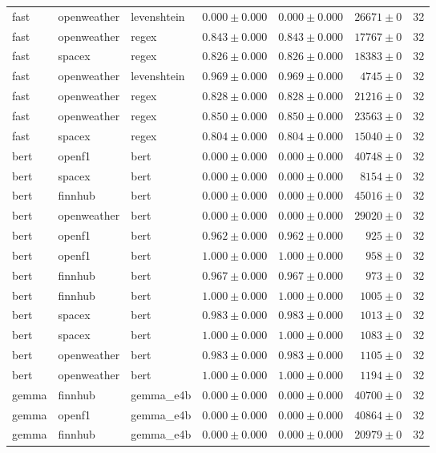 \begin{table}[htbp]
\begin{tabular}{l l l r r r r}
fast & openweather & levenshtein & $0.000\pm0.000$ & $0.000\pm0.000$ & $26671\pm0$ & 32 \\
fast & openweather & regex & $0.843\pm0.000$ & $0.843\pm0.000$ & $17767\pm0$ & 32 \\
fast & spacex & regex & $0.826\pm0.000$ & $0.826\pm0.000$ & $18383\pm0$ & 32 \\
fast & openweather & levenshtein & $0.969\pm0.000$ & $0.969\pm0.000$ & $4745\pm0$ & 32 \\
fast & openweather & regex & $0.828\pm0.000$ & $0.828\pm0.000$ & $21216\pm0$ & 32 \\
fast & openweather & regex & $0.850\pm0.000$ & $0.850\pm0.000$ & $23563\pm0$ & 32 \\
fast & spacex & regex & $0.804\pm0.000$ & $0.804\pm0.000$ & $15040\pm0$ & 32 \\
bert & openf1 & bert & $0.000\pm0.000$ & $0.000\pm0.000$ & $40748\pm0$ & 32 \\
bert & spacex & bert & $0.000\pm0.000$ & $0.000\pm0.000$ & $8154\pm0$ & 32 \\
bert & finnhub & bert & $0.000\pm0.000$ & $0.000\pm0.000$ & $45016\pm0$ & 32 \\
bert & openweather & bert & $0.000\pm0.000$ & $0.000\pm0.000$ & $29020\pm0$ & 32 \\
bert & openf1 & bert & $0.962\pm0.000$ & $0.962\pm0.000$ & $925\pm0$ & 32 \\
bert & openf1 & bert & $1.000\pm0.000$ & $1.000\pm0.000$ & $958\pm0$ & 32 \\
bert & finnhub & bert & $0.967\pm0.000$ & $0.967\pm0.000$ & $973\pm0$ & 32 \\
bert & finnhub & bert & $1.000\pm0.000$ & $1.000\pm0.000$ & $1005\pm0$ & 32 \\
bert & spacex & bert & $0.983\pm0.000$ & $0.983\pm0.000$ & $1013\pm0$ & 32 \\
bert & spacex & bert & $1.000\pm0.000$ & $1.000\pm0.000$ & $1083\pm0$ & 32 \\
bert & openweather & bert & $0.983\pm0.000$ & $0.983\pm0.000$ & $1105\pm0$ & 32 \\
bert & openweather & bert & $1.000\pm0.000$ & $1.000\pm0.000$ & $1194\pm0$ & 32 \\
gemma & finnhub & gemma\_e4b & $0.000\pm0.000$ & $0.000\pm0.000$ & $40700\pm0$ & 32 \\
gemma & openf1 & gemma\_e4b & $0.000\pm0.000$ & $0.000\pm0.000$ & $40864\pm0$ & 32 \\
gemma & finnhub & gemma\_e4b & $0.000\pm0.000$ & $0.000\pm0.000$ & $20979\pm0$ & 32 \\

\end{tabular}
\end{table}
